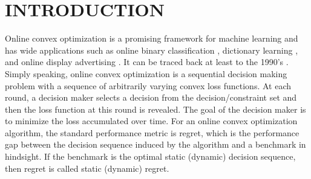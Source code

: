\documentclass[12pt,draftcls,onecolumn]{IEEEtran}%
\begin{document}
\section{INTRODUCTION}\label{online_opsec:intro}
Online convex optimization is a promising framework for machine learning and has wide applications such as online binary classification \cite{crammer2006online}, dictionary learning \cite{mairal2009online}, and online display advertising \cite{goldfarb2011online}. It can be traced back at least to the 1990's \cite{cesa1996worst,gentile1999linear,gordon1999regret}.
Simply speaking, online convex optimization is a sequential decision making problem with a sequence of arbitrarily varying convex loss functions. At each round, a decision maker selects a decision from the decision/constraint set and then the loss function at this round is revealed. The goal of the decision maker is to minimize the loss accumulated over time. For an online convex optimization algorithm, the standard performance metric is regret, which is the performance gap between the decision sequence induced by the algorithm and a benchmark in hindsight. If the benchmark is the optimal static (dynamic) decision sequence, then regret is called static (dynamic) regret.
\end{document}
